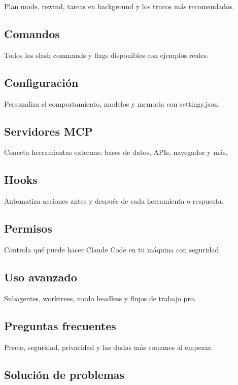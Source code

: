 \documentclass[11pt,a4paper]{report}
\begin{document}
Plan mode, rewind, tareas en background y los trucos más recomendados.

\subsection{Comandos}

Todos los slash commands y flags disponibles con ejemplos reales.

\subsection{Configuración}

Personaliza el comportamiento, modelos y memoria con settings.json.

\subsection{Servidores MCP}

Conecta herramientas externas: bases de datos, APIs, navegador y más.

\subsection{Hooks}

Automatiza acciones antes y después de cada herramienta o respuesta.

\subsection{Permisos}

Controla qué puede hacer Claude Code en tu máquina con seguridad.

\subsection{Uso avanzado}

Subagentes, worktrees, modo headless y flujos de trabajo pro.

\subsection{Preguntas frecuentes}

Precio, seguridad, privacidad y las dudas más comunes al empezar.

\subsection{Solución de problemas}
\end{document}
